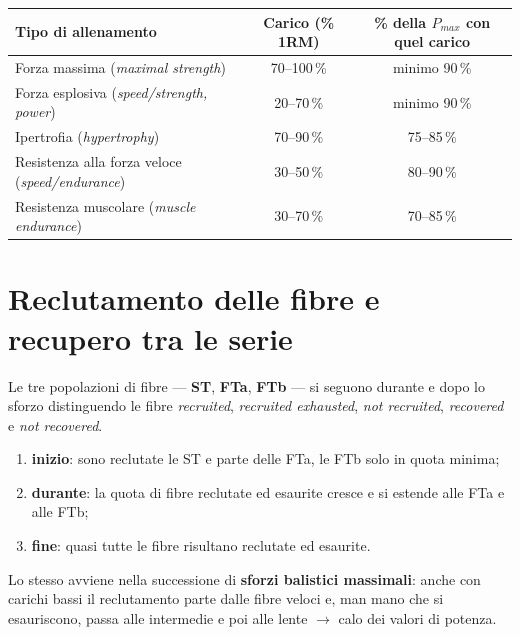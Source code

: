 \begin{table}[htbp]
  \centering
  \small
  \renewcommand{\arraystretch}{1.3}
  \begin{tabularx}{\textwidth}{|X|c|c|}
    \hline
    \textbf{Tipo di allenamento} & \textbf{Carico (\% 1RM)} &
      \textbf{\% della $P_{max}$ con quel carico} \\
    \hline
    Forza massima (\textit{maximal strength}) & 70--100\,\% & minimo 90\,\% \\
    \hline
    Forza esplosiva (\textit{speed/strength, power}) & 20--70\,\% & minimo 90\,\% \\
    \hline
    Ipertrofia (\textit{hypertrophy}) & 70--90\,\% & 75--85\,\% \\
    \hline
    Resistenza alla forza veloce (\textit{speed/endurance}) & 30--50\,\% & 80--90\,\% \\
    \hline
    Resistenza muscolare (\textit{muscle endurance}) & 30--70\,\% & 70--85\,\% \\
    \hline
  \end{tabularx}
\end{table}

\section{Reclutamento delle fibre e recupero tra le serie}

Le tre popolazioni di fibre --- \textbf{ST}, \textbf{FTa}, \textbf{FTb} --- si seguono durante e
dopo lo sforzo distinguendo le fibre \textit{recruited}, \textit{recruited exhausted}, \textit{not
recruited}, \textit{recovered} e \textit{not recovered}.

\begin{enumerate}
  \item \textbf{inizio}: sono reclutate le ST e parte delle FTa, le FTb solo in quota minima;
  \item \textbf{durante}: la quota di fibre reclutate ed esaurite cresce e si estende alle FTa e
    alle FTb;
  \item \textbf{fine}: quasi tutte le fibre risultano reclutate ed esaurite.
\end{enumerate}

Lo stesso avviene nella successione di \textbf{sforzi balistici massimali}: anche con carichi bassi
il reclutamento parte dalle fibre veloci e, man mano che si esauriscono, passa alle intermedie e poi
alle lente $\rightarrow$ calo dei valori di potenza.

